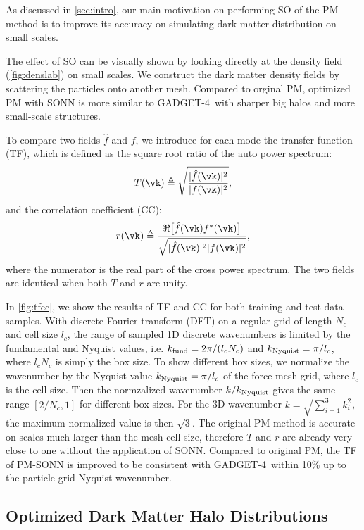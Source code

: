 \documentclass[modern, trackchanges, dvipsnames]{aastex631}
\newcommand{\GADGET}{{{\fontsize{10pt}{12pt}\selectfont GADGET}-4}}
\begin{document}
As discussed in \autoref{sec:intro}, our main motivation on performing
SO of the PM method is to improve its accuracy on simulating dark matter
distribution on small scales.

The effect of SO can be visually shown by looking directly at the
density field (\autoref{fig:denslab}) on small scales.
We construct the dark matter density fields by scattering the particles
onto another mesh.
Compared to orginal PM, optimized PM with SONN is more similar to
\GADGET\ with sharper big halos and more small-scale structures.

To compare two fields $\hat f$ and $f$, we introduce for each mode the
transfer function (TF), which is defined as the square root ratio of the
auto power spectrum:
%
\begin{equation}
T(\vk) \triangleq
\sqrt{\frac{|\hat f(\vk)|^2}{|f(\vk)|^2}},
\label{T}
\end{equation}
%
and the correlation coefficient (CC):
%
\begin{equation}
r(\vk) \triangleq
\frac{\Re \bigl[ \hat f(\vk) f^*(\vk) \bigr]}
     {\sqrt{|\hat f(\vk)|^2 |f(\vk)|^2}},
\label{r}
\end{equation}
%
where the numerator is the real part of the cross power spectrum.
The two fields are identical when both $T$ and $r$ are unity.

In \autoref{fig:tfcc}, we show the results of TF and CC for both
training and test data samples.
With discrete Fourier transform (DFT) on a regular grid of length $N_c$
and cell size $l_c$, the range of sampled 1D discrete wavenumbers is
limited by the fundamental and Nyquist values, i.e. $k_{\rm fund} =
2\pi/(l_c N_c)$ and $k_{\rm Nyquist} = \pi/l_c$, where $l_c N_c$ is
simply the box size.
To show different box sizes, we normalize the wavenumber by the Nyquist
value $k_{\rm Nyquist} = \pi / l_c$ of the force mesh grid, where
$l_c$ is the cell size.
Then the normzalized wavenumber $k/k_{\rm Nyquist}$ gives the same range
$[2/N_c, 1]$ for different box sizes.
For the 3D wavenumber $k=\sqrt{\sum_{i=1}^{3}k_i^2}$, the maximum
normalized value is then $\sqrt{3}$.
The original PM method is accurate on scales much larger than the mesh
cell size, therefore $T$ and $r$ are already very close to one without
the application of SONN.
Compared to original PM, the TF of PM-SONN is improved to be consistent
with \GADGET\ within 10\% up to the particle grid Nyquist wavenumber.


\subsection{Optimized Dark Matter Halo Distributions}
\end{document}
